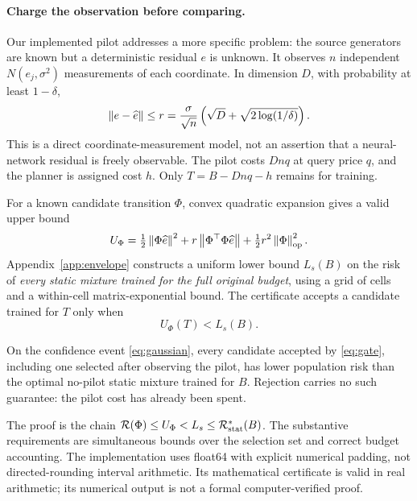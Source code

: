 \paragraph{Charge the observation before comparing.}
Our implemented pilot addresses a more specific problem: the source generators are known but a deterministic residual $e$ is unknown. It observes $n$ independent $N(e_j,\sigma^2)$ measurements of each coordinate. In dimension $D$, with probability at least $1-\delta$,
\begin{equation}
 \left\lVert e-\widehat e\right\rVert\le r=\frac{\sigma}{\sqrt n}
       \left(\sqrt D+\sqrt{2\log(1/\delta)}\right).\label{eq:gaussian}
\end{equation}
This is a direct coordinate-measurement model, not an assertion that a neural-network residual is freely observable. The pilot costs $Dnq$ at query price $q$, and the planner is assigned cost $h$. Only $T=B-Dnq-h$ remains for training.

For a known candidate transition $\Phi$, convex quadratic expansion gives a valid upper bound
\begin{equation}
 U_\Phi=\tfrac12\left\lVert\Phi\widehat e\right\rVert^2
 +r\left\lVert\Phi^\top\Phi\widehat e\right\rVert
 +\tfrac12r^2\left\lVert\Phi\right\rVert_{\mathrm{op}}^2.\label{eq:upper}
\end{equation}
Appendix~\ref{app:envelope} constructs a uniform lower bound $L_s(B)$ on the risk of \emph{every static mixture trained for the full original budget}, using a grid of cells and a within-cell matrix-exponential bound. The certificate accepts a candidate trained for $T$ only when
\begin{equation}
 U_\Phi(T)<L_s(B).\label{eq:gate}
\end{equation}

\begin{proposition}\label{prop:accept}
On the confidence event \eqref{eq:gaussian}, every candidate accepted by \eqref{eq:gate}, including one selected after observing the pilot, has lower population risk than the optimal no-pilot static mixture trained for $B$. Rejection carries no such guarantee: the pilot cost has already been spent.
\end{proposition}
The proof is the chain $\mathcal R(\Phi)\le U_\Phi<L_s\le\mathcal R_{\mathrm{stat}}^*(B)$. The substantive requirements are simultaneous bounds over the selection set and correct budget accounting. The implementation uses float64 with explicit numerical padding, not directed-rounding interval arithmetic. Its mathematical certificate is valid in real arithmetic; its numerical output is not a formal computer-verified proof.

